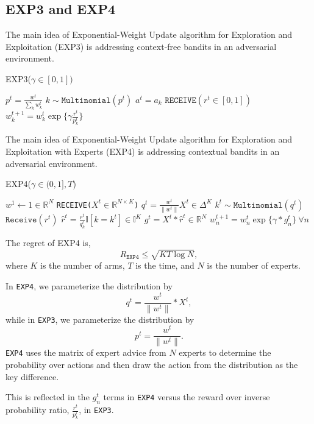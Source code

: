 \documentclass[11pt]{article}
\begin{document}
\subsection{EXP3 and EXP4}

The main idea of Exponential-Weight Update algorithm for Exploration and Exploitation (EXP3) is addressing context-free bandits in an adversarial environment.

\begin{algorithm}[H]
\caption{EXP3($\gamma \in [0,1])$}
\begin{algorithmic}
    \STATE $p^t = \frac{w^t}{\sum_k w_k^t}$
    \STATE $k \sim \texttt{Multinomial}(p^t)$
    \STATE $a^t = a_k$
    \STATE $\texttt{RECEIVE}(r^t \in [0,1])$
    \STATE $w_k^{t+1} = w_k^t \exp\{\gamma \frac{r^t}{p_k^t}\}$
\ENDFOR
\end{algorithmic}
\end{algorithm}

The main idea of Exponential-Weight Update algorithm for Exploration and Exploitation with Experts (EXP4) is addressing contextual bandits in an adversarial environment.

\begin{algorithm}[H]
\caption{EXP4($\gamma \in (0,1], T$)}
\begin{algorithmic}
\STATE $w^1 \gets 1 \in \mathbb{R}^N$
    \STATE \texttt{RECEIVE($X^t \in \mathbb{R}^{N \times K}$)}
    \STATE $q^t = \frac{w^t}{\|w^t\|}X^t \in \Delta^K$
    \STATE $k^t \sim \texttt{Multinomial}(q^t)$
    \STATE $\texttt{Receive}(r^t)$
    \STATE $\hat{r}^t = \frac{r^t}{q_k^t}\mathbb{I}[k=k^t]\in \mathbb{I}^K$
    \STATE $g^t = X^t * \hat{r}^t \in \mathbb{R}^N$
    \STATE $w_n^{t+1} = w_n^t \exp\{\gamma *g_n^t\} \ \forall n$
\ENDFOR
\end{algorithmic}
\end{algorithm}

The regret of EXP4 is,
$$R_{\texttt{EXP4}} \leq \sqrt{KT\log N},$$
where $K$ is the number of arms, $T$ is the time, and $N$ is the number of experts.

In \texttt{EXP4}, we parameterize the distribution by 
$$ q^t = \frac{w^t}{\|w^t\|} * X^t, $$
while in \texttt{EXP3}, we parameterize the distribution by 
$$p^t = \frac{w^t}{\|w^t\|}.$$
\texttt{EXP4} uses the matrix of expert advice from $N$ experts to determine the probability over actions and then draw the action from the distribution as the key difference.

This is reflected in the $g_n^t$ terms in \texttt{EXP4} versus the reward over inverse probability ratio, $\frac{r^t}{p_k^t}$, in \texttt{EXP3}.
\end{document}
